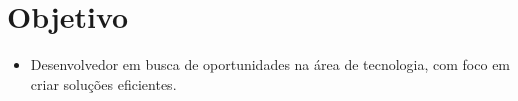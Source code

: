 \section{Objetivo}
    \begin{itemize}[leftmargin=0.15in, label={}]
        \item{Desenvolvedor em busca de oportunidades na área de tecnologia, com foco em criar soluções eficientes.}
    \end{itemize}